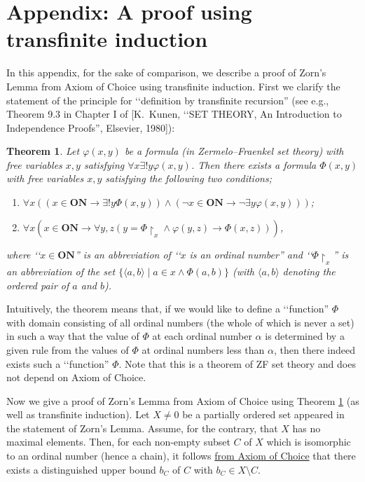 \documentclass{article}
\newtheorem{theorem}{Theorem}
\begin{document}
\section*{Appendix: A proof using transfinite induction}

In this appendix, for the sake of comparison, we describe a proof of Zorn's Lemma from Axiom of Choice using transfinite induction.
First we clarify the statement of the principle for \lq\lq definition by transfinite recursion'' (see e.g., Theorem 9.3 in Chapter I of [K.~Kunen, \lq\lq SET THEORY, An Introduction to Independence Proofs'',  Elsevier, 1980]):
\begin{theorem}
\label{thm:transfinite_induction}
Let $\varphi(x,y)$ be a formula (in Zermelo--Fraenkel set theory) with free variables $x,y$ satisfying $\forall x \exists! y \varphi(x,y)$.
Then there exists a formula $\Phi(x,y)$ with free variables $x,y$ satisfying the following two conditions;
\begin{enumerate}
\item $\forall x ( (x \in \mathbf{ON} \to \exists! y \Phi(x,y)) \land (\neg x \in \mathbf{ON} \to \neg\exists y \varphi(x,y) ) )$;
\item $\forall x ( x \in \mathbf{ON} \to \forall y,z ( y = \Phi\!\upharpoonright_x \land \varphi(y,z) \to \Phi(x,z) ) )$,
\end{enumerate}
where \lq\lq $x \in \mathbf{ON}$'' is an abbreviation of \lq\lq $x$ is an ordinal number'' and \lq\lq $\Phi\!\upharpoonright_x$'' is an abbreviation of the set $\{\langle a,b \rangle \mid a \in x \land \Phi(a,b)\}$ (with $\langle a,b \rangle$ denoting the ordered pair of $a$ and $b$).
\end{theorem}
Intuitively, the theorem means that, if we would like to define a \lq\lq function'' $\Phi$ with domain consisting of all ordinal numbers (the whole of which is never a set) in such a way that the value of $\Phi$ at each ordinal number $\alpha$ is determined by a given rule from the values of $\Phi$ at ordinal numbers less than $\alpha$, then there indeed exists such a \lq\lq function'' $\Phi$.
Note that this is a theorem of ZF set theory and does not depend on Axiom of Choice.

Now we give a proof of Zorn's Lemma from Axiom of Choice using Theorem \ref{thm:transfinite_induction} (as well as transfinite induction).
Let $X \neq 0$ be a partially ordered set appeared in the statement of Zorn's Lemma.
Assume, for the contrary, that $X$ has no maximal elements.
Then, for each non-empty subset $C$ of $X$ which is isomorphic to an ordinal number (hence a chain), it follows \underline{from Axiom of Choice} that there exists a distinguished upper bound $b_C$ of $C$ with $b_C \in X \setminus C$.
\end{document}
